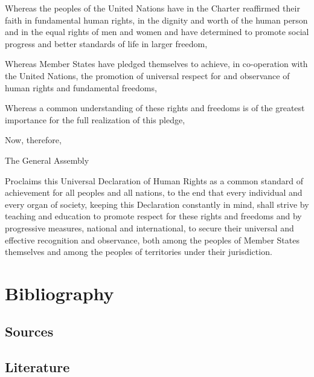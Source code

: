 \documentclass[
  ngerman,
  american,
  titlepage,
  openright,
  DIV=calc,
  toc=listof,
  listof=nochaptergap]{scrbook}
\begin{document}
Whereas the peoples of the United Nations have in the Charter reaffirmed
their faith in fundamental human rights, in the dignity and worth of the
human person and in the equal rights of men and women and have
determined to promote social progress and better standards of life in
larger freedom,

Whereas Member States have pledged themselves to achieve, in
co-operation with the United Nations, the promotion of universal respect
for and observance of human rights and fundamental freedoms,

Whereas a common understanding of these rights and freedoms is of the
greatest importance for the full realization of this pledge,

Now, therefore,

The General Assembly

Proclaims this Universal Declaration of Human Rights as a common
standard of achievement for all peoples and all nations, to the end that
every individual and every organ of society, keeping this Declaration
constantly in mind, shall strive by teaching and education to promote
respect for these rights and freedoms and by progressive measures,
national and international, to secure their universal and effective
recognition and observance, both among the peoples of Member States
themselves and among the peoples of territories under their
jurisdiction.


\listoffigures

\chapter{Bibliography}\label{bibliography}

\section{Sources}\label{sources}

\protect{}\label{refs_sources}

\clearpage

\section{Literature}\label{literature}

\protect{}\label{refs_main}


\backmatter
\end{document}
